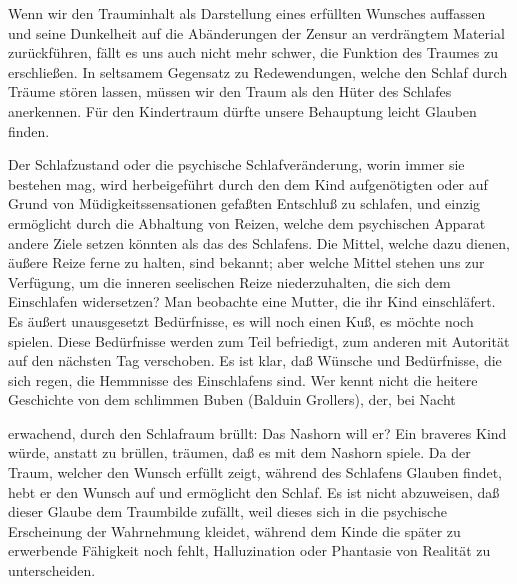 \documentclass[twoside=true,titlepage=false,open=any, parskip=never, fontsize=10pt, headings=small, chapterprefix=false, appendixprefix=false]{scrbook}
\begin{document}
        \pstart
        Wenn wir den Trauminhalt als Darstellung eines erfüllten Wunsches auffassen und
               seine Dunkelheit auf die Abänderungen der Zensur an verdrängtem Material
               zurückführen, fällt es uns auch nicht mehr schwer, die Funktion des Traumes zu
               erschließen. In seltsamem Gegensatz zu Redewendungen, welche den Schlaf
               durch Träume stören lassen, müssen wir den Traum als den
                  Hüter des Schlafes anerkennen. Für den Kindertraum dürfte unsere
               Behauptung leicht Glauben finden.
        \pend
    
            
        \pstart
        Der Schlafzustand oder die psychische Schlafveränderung, worin immer sie
               bestehen mag, wird herbeigeführt durch den dem Kind aufgenötigten oder auf Grund
               von Müdigkeitssensationen gefaßten Entschluß zu schlafen, und einzig ermöglicht
               durch die Abhaltung von Reizen, welche dem psychischen Apparat andere Ziele
               setzen könnten als das des Schlafens. Die Mittel, welche dazu dienen, äußere
               Reize ferne zu halten, sind bekannt; aber welche Mittel stehen uns zur
               Verfügung, um die inneren seelischen Reize niederzuhalten, die sich
               dem Einschlafen widersetzen? Man beobachte eine Mutter, die ihr Kind
               einschläfert. Es äußert unausgesetzt Bedürfnisse, es will noch einen Kuß, es
               möchte noch spielen. Diese Bedürfnisse werden zum Teil befriedigt, zum
               anderen mit Autorität auf den nächsten Tag verschoben. Es ist klar, daß
               Wünsche und Bedürfnisse, die sich regen, die Hemmnisse des Einschlafens sind.
               Wer kennt nicht die heitere Geschichte von dem schlimmen Buben (Balduin Grollers),
                  \edtext{}{\Bendnote{
                  \textbf{die heitere Geschichte von dem schlimmen Buben (Balduin Grollers)}]
                     Vom kleinen Rudi (1897), Roman von
                  Balduin Groller (d.i. Adalbert Goldscheider), dem Erfinder des österreichischen
                  Sherlock Holmes, alias Detektiv Dagobert Trostler. }}
     der, bei Nacht
        \pend
    
         
            
            
            
        \pstart
        erwachend, durch den Schlafraum brüllt: Das
                  Nashorn will er? Ein braveres Kind würde, anstatt zu brüllen, träumen, daß es mit dem Nashorn spiele. Da der
               Traum, welcher den Wunsch erfüllt zeigt, während des Schlafens Glauben findet, hebt er den Wunsch auf und
               ermöglicht den Schlaf. Es ist nicht abzuweisen, daß dieser Glaube dem
               Traumbilde zufällt, weil dieses sich in die psychische Erscheinung der
               Wahrnehmung kleidet, während dem Kinde die später zu erwerbende Fähigkeit
               noch fehlt, Halluzination oder Phantasie von Realität zu unterscheiden.
        \pend
    
\end{document}
